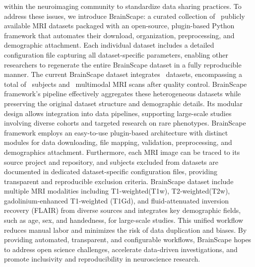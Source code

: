 within the neuroimaging community to standardize data sharing practices. 
To address these issues, we introduce BrainScape: a curated collection of \NumDatasets\ publicly available MRI datasets 
packaged with an open-source, plugin-based Python framework that automates their download, organization, preprocessing, and demographic attachment. 
Each individual dataset includes a detailed configuration file capturing all dataset-specific parameters, 
enabling other researchers to regenerate the entire BrainScape dataset in a fully reproducible manner. 
The current BrainScape dataset integrates \NumDatasets\ datasets,
encompassing a total of \TotalSubjectsIncludedAfterInspectionCount\ subjects and \TotalNumMRIs\ multimodal MRI scans after quality control. 
BrainScape framework's pipeline effectively aggregates these heterogeneous datasets while preserving the original dataset structure and demographic details.
Its modular design allows integration into data pipelines, supporting large-scale studies involving diverse cohorts and targeted research on rare phenotypes. 
BrainScape framework employs an easy-to-use plugin-based architecture with distinct modules for data downloading, file mapping, validation, preprocessing, and demographics attachment. 
Furthermore, each MRI image can be traced to its source project and repository, and subjects excluded from datasets are documented in dedicated dataset-specific configuration files, 
providing transparent and reproducible exclusion criteria.
BrainScape dataset include multiple MRI modalities including T1-weighted(T1w), T2-weighted(T2w), 
gadolinium-enhanced T1-weighted (T1Gd), and fluid-attenuated inversion recovery (FLAIR) from diverse sources 
and integrates key demographic fields, such as age, sex, and handedness, for large-scale studies.
This unified workflow reduces manual labor and minimizes the risk of data duplication and biases. 
By providing automated, transparent, and configurable workflows, 
BrainScape hopes to address open science challenges, accelerate data-driven investigations, 
and promote inclusivity and reproducibility in neuroscience research. 
